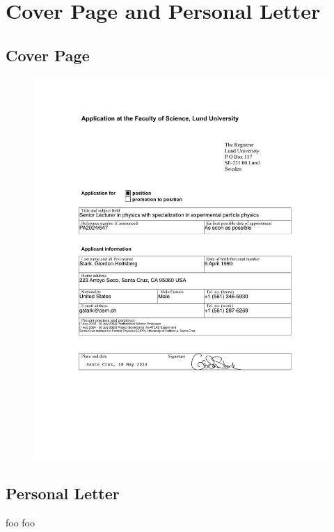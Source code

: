 \chapter{Cover Page and Personal Letter}

\section{Cover Page} \label{sec:cover-page}
\begin{figure}[h!]
	\centering
	\includegraphics[width=1.0\linewidth]{attachments/cover-letter-academic-position-180928}
\end{figure}

\clearpage

\section{Personal Letter} \label{sec:personal-letter}
foo foo

